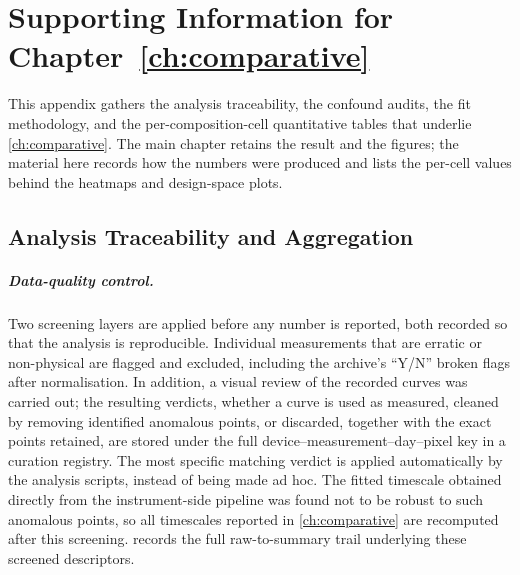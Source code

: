 
\chapter{Supporting Information for Chapter~\ref*{ch:comparative}}\label{app:ch4_si}

This appendix gathers the analysis traceability, the confound audits, the
fit methodology, and the per-composition-cell quantitative tables that underlie
\cref{ch:comparative}. The main chapter retains the result and the figures; the
material here records how the numbers were produced and lists the per-cell values
behind the heatmaps and design-space plots.

\section{Analysis Traceability and Aggregation}\label{app:ch4_provenance}

\paragraph{Data-quality control.} Two screening layers are applied before any
number is reported, both recorded so that the analysis is reproducible.
Individual measurements that are erratic or non-physical are flagged and
excluded, including the archive's “Y/N” broken flags after normalisation. In
addition, a visual review of the recorded curves was carried out; the resulting
verdicts, whether a curve is used as measured, cleaned by removing identified
anomalous points, or discarded, together with the exact points retained, are
stored under the full device--measurement--day--pixel key in a curation registry.
The most specific matching verdict is applied automatically by the analysis
scripts, instead of being made ad hoc. The fitted
timescale obtained directly from the instrument-side pipeline was found not to be
robust to such anomalous points, so all timescales reported in \cref{ch:comparative}
are recomputed after this screening.  records the full
raw-to-summary trail underlying these screened descriptors.


